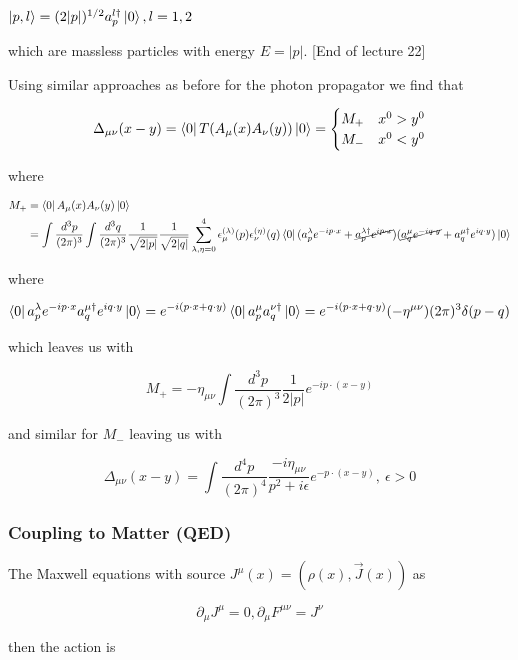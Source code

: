 \documentclass{article}
\theoremstyle{definition}
\begin{document}
$\ket{p, l} = (2|p|)^{1/2} a^{l \dagger}_p \ket{0}, l=1,2$

which are massless particles with energy $E = |p|$. [End of lecture 22]

Using similar approaches as before for the photon propagator we find that

$$ \Delta_{\mu \nu} (x - y) = \bra{0} T(A_\mu(x) A_\nu(y)) \ket{0} =
\begin{cases}
  M_+ & x^0 > y^0 \\
  M_- & x^0 < y^0
\end{cases} $$

where

\begin{align*}
  M_+ &= \bra{0} A_\mu(x) A_\nu(y) \ket{0} \\
      &= \int \frac{d^3p}{(2\pi)^3} \int \frac{d^3q}{(2\pi)^3} \frac{1}{\sqrt{2 |p|}} \frac{1}{\sqrt{2 |q|}}
        \sum_{\lambda, \eta=0}^4 \epsilon_\mu^{(\lambda)}(p) \epsilon_\nu^{(\eta)}(q)
        \bra{0} (a_p^\lambda e^{-ip \cdot x} + \cancel{a^{\lambda \dagger}_p e^{ip \cdot x}})
        (\cancel{a^\mu_q e^{-iq \cdot y}} + a_q^{\mu \dagger} e^{iq \cdot y}) \ket{0} \\
\end{align*}

where

$$ \bra{0} a_p^\lambda e^{-ip \cdot x} a_q^{\mu \dagger} e^{iq \cdot y} \ket{0}
      = e^{-i(p \cdot x + q \cdot y)} \bra{0} a_p^\mu a_q^{\nu \dagger} \ket{0}
      = e^{-i(p \cdot x + q \cdot y)} (- \eta^{\mu \nu}) (2\pi)^3 \delta(p - q) $$

which leaves us with

$$ M_+ = -\eta_{\mu \nu} \int \frac{d^3p}{(2\pi)^3} \frac{1}{2|p|} e^{-ip \cdot
  (x - y)} $$

and similar for $M_-$ leaving us with

$$ \Delta_{\mu \nu}(x - y) = \int \frac{d^4p}{(2\pi)^4} \frac{-i \eta_{\mu
    \nu}}{p^2 + i\epsilon} e^{-p \cdot (x - y)}, \ \epsilon > 0 $$

\subsubsection{Coupling to Matter (QED)}

The Maxwell equations with source $J^\mu(x) = (\rho(x), \vec{J}(x))$ as

$$ \partial_\mu J^\mu = 0, \partial_\mu F^{\mu \nu} = J^\nu $$

then the action is
\end{document}
